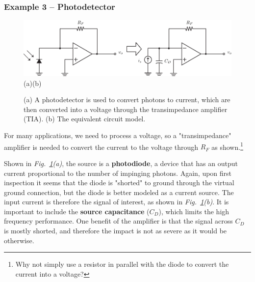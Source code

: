 \subsubsection{Example 3 – Photodetector}
\begin{figure}[t]
\centering
\includegraphics[width=\columnwidth]{ex_photodetect}\\
(a)\hspace{6cm}(b)
\caption{(a) A photodetector is used to convert photons to current, which are then converted into a voltage through the transimpedance amplifier (TIA).  (b) The equivalent circuit model.}
\label{fig:pd_detect}
\end{figure}
For many applications, we need to process a voltage, so a "transimpedance" amplifier is needed to convert the current to the voltage through $R_F$ as shown.\footnote{Why not simply use a resistor in parallel with the diode to convert the current into a voltage?}

Shown in \emph{Fig.~\ref{fig:pd_detect}(a)}, the source is a \textbf{photodiode}, a device that has an output current proportional to the number of impinging photons.  Again, upon first inspection it seems that the diode is "shorted" to ground through the virtual ground connection, but the diode is better modeled as a current source.  The input current is therefore the signal of interest, as shown in \emph{Fig.~\ref{fig:pd_detect}(b)}.  It is important to include the \textbf{source capacitance} ($C_D$), which limits the high frequency performance.  One benefit of the amplifier is that the signal across $C_D$ is mostly shorted, and therefore the impact is not as severe as it would be otherwise.
